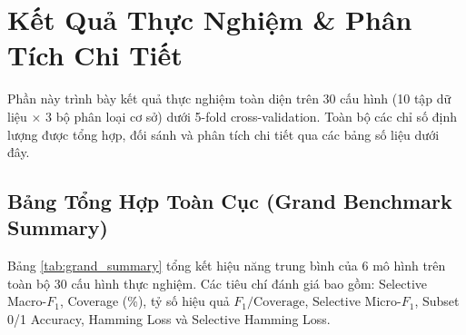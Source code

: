 \documentclass[10pt,a4paper,twoside]{article}
\begin{document}
\section{Kết Quả Thực Nghiệm \& Phân Tích Chi Tiết}
Phần này trình bày kết quả thực nghiệm toàn diện trên 30 cấu hình (10 tập dữ liệu $\times$ 3 bộ phân loại cơ sở) dưới 5-fold cross-validation. Toàn bộ các chỉ số định lượng được tổng hợp, đối sánh và phân tích chi tiết qua các bảng số liệu dưới đây.

\subsection{Bảng Tổng Hợp Toàn Cục (Grand Benchmark Summary)}
Bảng \ref{tab:grand_summary} tổng kết hiệu năng trung bình của 6 mô hình trên toàn bộ 30 cấu hình thực nghiệm. Các tiêu chí đánh giá bao gồm: Selective Macro-$F_1$, Coverage (\%), tỷ số hiệu quả $F_1/\text{Coverage}$, Selective Micro-$F_1$, Subset 0/1 Accuracy, Hamming Loss và Selective Hamming Loss.

\begin{table}[H]
\centering
\caption{Bảng tổng hợp toàn diện hiệu năng đa tiêu chí đối sánh giữa 6 hệ thống mô hình (In đậm kết quả tối ưu).}
\label{tab:grand_summary}
\end{table}
\end{document}
